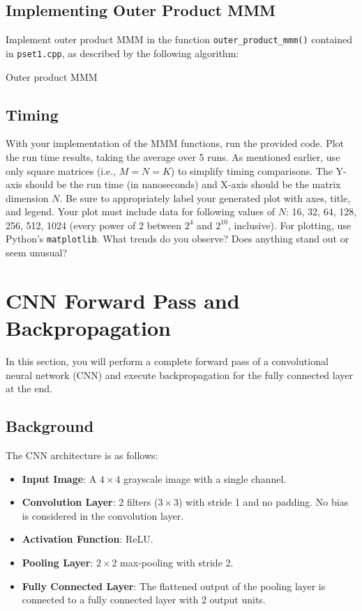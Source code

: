 \documentclass[a4 paper]{article}
\begin{document}
\subsection*{Implementing Outer Product MMM}
Implement outer product MMM in the function \texttt{outer\_product\_mmm()} contained in \texttt{pset1.cpp}, as described by the following algorithm:

\begin{algorithm}[H]
\SetAlgoLined
\SetInd{0.25em}{0.5em}
\caption{Outer product MMM}
\label{algo:naivemm-kmn}
\end{algorithm}

\subsection*{Timing}
With your implementation of the MMM functions, run the provided code.
Plot the run time results, taking the average over 5 runs.
As mentioned earlier, use only square matrices (i.e., $M = N = K$) to simplify timing comparisons.
The Y-axis should be the run time (in nanoseconds) and X-axis should be the matrix dimension $N$.
Be sure to appropriately label your generated plot with axes, title, and legend.
Your plot must include data for following values of $N$: 16, 32, 64, 128, 256, 512, 1024 (every power of 2 between $2^4$ and $2^{10}$, inclusive).
For plotting, use Python’s \texttt{matplotlib}.
What trends do you observe?
Does anything stand out or seem unusual?

\solution{}

\newpage
\section{CNN Forward Pass and Backpropagation}
\label{sec:cnn}

In this section, you will perform a complete forward pass of a convolutional neural network (CNN) and execute backpropagation for the fully connected layer at the end.

\subsection*{Background}
The CNN architecture is as follows:

\begin{itemize}
    \item \textbf{Input Image}: A $4 \times 4$ grayscale image with a single channel.
    \item \textbf{Convolution Layer}: 2 filters ($3 \times 3$) with stride 1 and no padding. No bias is considered in the convolution layer.
    \item \textbf{Activation Function}: ReLU.
    \item \textbf{Pooling Layer}: $2 \times 2$ max-pooling with stride 2.
    \item \textbf{Fully Connected Layer}: The flattened output of the pooling layer is connected to a fully connected layer with 2 output units.
\end{itemize}
\end{document}
